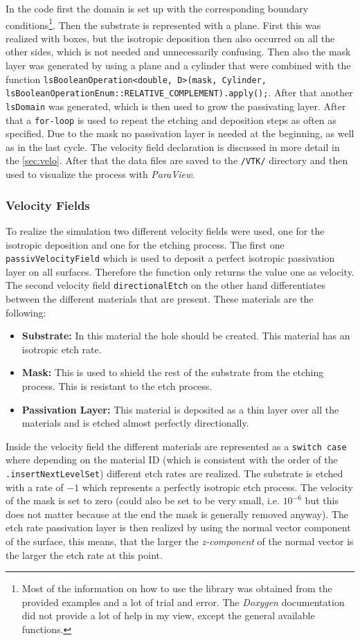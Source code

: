 \documentclass[12pt,a4paper]{article}
\begin{document}
In the code first the domain is set up with the corresponding boundary conditions\footnote{Most of the information on how to use the library was obtained from the provided examples and a lot of trial and error. The \textit{Doxygen} documentation did not provide a lot of help in my view, except the general available functions.}. Then the substrate is represented with a plane. First this was realized with boxes, but the isotropic deposition then also occurred on all the other sides, which is not needed and unnecessarily confusing. Then also the mask layer was generated by using a plane and a cylinder that were combined with the function \lstinline{lsBooleanOperation<double, D>(mask, Cylinder, lsBooleanOperationEnum::RELATIVE_COMPLEMENT).apply();}. After that another \lstinline{lsDomain} was generated, which is then used to grow the passivating layer. After that a \lstinline{for-loop} is used to repeat the etching and deposition steps as often as specified. Due to the mask no passivation layer is needed at the beginning, as well as in the last cycle. The velocity field declaration is discussed in more detail in the \autoref{sec:velo}. After that the data files are saved to the \lstinline{/VTK/} directory and then used to visualize the process with \textit{ParaView}.

\subsubsection{Velocity Fields} \label{sec:velo}
To realize the simulation two different velocity fields were used, one for the isotropic deposition and one for the etching process. The first one \lstinline{passivVelocityField} which is used to deposit a perfect isotropic passivation layer on all surfaces. Therefore the function only returns the value one as velocity. The second velocity field \lstinline{directionalEtch} on the other hand differentiates between the different materials that are present. These materials are the following:
\begin{itemize}
    \item \textbf{Substrate: }In this material the hole should be created. This material has an isotropic etch rate.
    \item \textbf{Mask: }This is used to shield the rest of the substrate from the etching process. This is resistant to the etch process.
    \item \textbf{Passivation Layer: }This material is deposited as a thin layer over all the materials and is etched almost perfectly directionally.
\end{itemize} 
Inside the velocity field the different materials are represented as a \lstinline{switch case} where depending on the material ID (which is consistent with the order of the \lstinline{.insertNextLevelSet}) different etch rates are realized. The substrate is etched with a rate of $-1$ which represents a perfectly isotropic etch process. The velocity of the mask is set to zero (could also be set to be very small, i.e. $10^{-6}$ but this does not matter because at the end the mask is generally removed anyway). The etch rate passivation layer is then realized by using the normal vector component of the surface, this means, that the larger the \textit{z-component} of the normal vector is the larger the etch rate at this point. 
\end{document}
